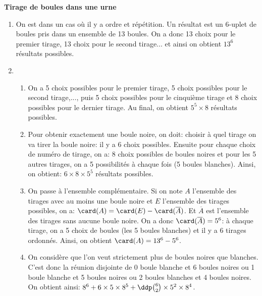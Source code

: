 \documentclass[a4paper, 11pt]{article}
\begin{document}
\begin{correction}   \;  \textbf{Tirage de boules dans une urne}\\
	\begin{enumerate}
		\item  On est dans un cas o\`u il y a ordre et r\'ep\'etition. Un r\'esultat est un 6-uplet de boules pris dans un ensemble de 13 boules. On a donc
		      13 choix pour le premier tirage, 13 choix pour le second tirage... et ainsi on obtient $13^6$ r\'esultats possibles.
		\item
		      \begin{enumerate}
			      \item On a 5 choix possibles pour le premier tirage, 5 choix possibles pour le second tirage,..., puis 5 choix possibles pour le cinqui\`eme tirage et 8 choix possibles pour le dernier tirage. Au final, on obtient $5^5\times 8$ r\'esultats possibles.
			      \item Pour obtenir exactement une boule noire, on doit: choisir \`a quel tirage on va tirer la boule noire: il y a 6 choix possibles. Ensuite pour chaque choix de num\'ero de tirage, on a: 8 choix possibles de boules noires et pour les 5 autres tirages, on a 5 possibilit\'es \`a chaque fois (5 boules blanches). Ainsi, on obtient: $6\times 8\times 5^5$ r\'esultats possibles.
			      \item On passe \`a l'ensemble compl\'ementaire. Si on note $A$ l'ensemble des tirages avec au moins une boule noire et $E$ l'ensemble des tirages possibles, on a: $\card (A)=\card (E)-\card (\overline{A})$. Et $\overline{A}$ est l'ensemble des tirages sans aucune boule noire. On a donc $\card (\overline{A})=5^6$: \`a chaque tirage, on a 5 choix de boules (les 5 boules blanches) et il y a 6 tirages ordonn\'es. Ainsi, on obtient $\card (A)=13^6-5^6$.
			      \item On consid\`ere que l'on veut strictement plus de boules noires que blanches. C'est donc la r\'eunion disjointe de 0 boule blanche et 6 boules noires ou 1 boule blanche et 5 boules noires ou 2 boules blanches et 4 boules noires. On obtient ainsi: $8^6+ 6\times 5\times 8^5 + \ddp \binom{6}{2}\times 5^2 \times 8^4$.
		      \end{enumerate}
	\end{enumerate}
\end{correction}
\end{document}
